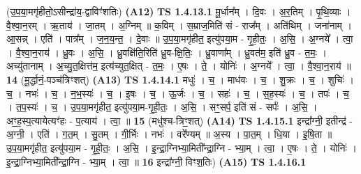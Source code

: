 \documentclass[17pt]{extarticle}
\begin{document}
                      (उ॒प॒या॒मगृ॑हीतो॒ऽसीन्द्रा॑य॒-द्वाविꣳ॑शतिः)  \textbf{(A12)} \newline \newline
                                \textbf{ TS 1.4.13.1} \newline
                  मू॒र्धान᳚म् । दि॒वः । अ॒र॒तिम् । पृ॒थि॒व्याः । वै॒श्वा॒न॒रम् । ऋ॒ताय॑ । जा॒तम् । अ॒ग्निम् ॥ क॒विम् । स॒म्राज॒मिति॑ सं - राज᳚म् । अति॑थिम् । जना॑नाम् । आ॒सन्न् । एति॑ । पात्र᳚म् । ज॒न॒य॒न्त॒ । दे॒वाः ॥ उ॒प॒या॒मगृ॑हीत॒ इत्यु॑पया॒म - गृ॒ही॒तः॒ । अ॒सि॒ । अ॒ग्नये᳚ । त्वा॒ । वै॒श्वा॒न॒राय॑ । ध्रु॒वः । अ॒सि॒ । ध्रु॒वक्षि॑ति॒रिति॑ ध्रु॒व-क्षि॒तिः॒ । ध्रु॒वाणा᳚म् । ध्रु॒वत॑म॒ इति॑ ध्रु॒व - त॒मः॒ । अच्यु॑तानाम् । अ॒च्यु॒त॒क्षित्त॑म॒ इत्य॑च्युत॒क्षित् - त॒मः॒ । ए॒षः । ते॒ । योनिः॑ । अ॒ग्नये᳚ । त्वा॒ । वै॒श्वा॒न॒राय॑ ॥ \textbf{  14} \newline
                  \newline
                      (मू॒र्द्धानं॒-पञ्च॑त्रिꣳशत्)  \textbf{(A13)} \newline \newline
                                \textbf{ TS 1.4.14.1} \newline
                  मधुः॑ । च॒ । माध॑वः । च॒ । शु॒क्रः । च॒ । शुचिः॑ । च॒ । नभः॑ । च॒ । न॒भ॒स्यः॑ । च॒ । इ॒षः । च॒ । ऊ॒र्जः । च॒ । सहः॑ । च॒ । स॒ह॒स्यः॑ । च॒ । तपः॑ । च॒ । त॒प॒स्यः॑ । च॒ । उ॒प॒या॒मगृ॑हीत॒ इत्यु॑पया॒म-गृ॒ही॒तः॒ । अ॒सि॒ । सꣳ॒॒सर्प॒ इति॑ सं - सर्पः॑ । अ॒सि॒ । अꣳ॒॒ह॒स्प॒त्यायेत्यꣳ॑हः - प॒त्याय॑ । त्वा॒ ॥ \textbf{  15 } \newline
                  \newline
                      (मधु॑श्च-त्रिꣳ॒॒शत्)  \textbf{(A14)} \newline \newline
                                \textbf{ TS 1.4.15.1} \newline
                  इन्द्रा᳚ग्नी॒ इतीन्द्र॑ - अ॒ग्नी॒ । एति॑ । ग॒त॒म् । सु॒तम् । गी॒र्भिः । नभः॑ । वरे᳚ण्यम् ॥ अ॒स्य । पा॒त॒म् । धि॒या । इ॒षि॒ता ॥ उ॒प॒या॒मगृ॑हीत॒ इत्यु॑पया॒म - गृ॒ही॒तः॒ । अ॒सि॒ । इ॒न्द्रा॒ग्निभ्या॒मिती᳚न्द्रा॒ग्नि - भ्या॒म् । त्वा॒ । ए॒षः । ते॒ । योनिः॑ । इ॒न्द्रा॒ग्निभ्या॒मिती᳚न्द्रा॒ग्नि - भ्या॒म् । त्वा॒ ॥ \textbf{  16} \newline
                  \newline
                       इन्द्रा᳚ग्नी॒ विꣳश॒तिः)  \textbf{(A15)} \newline \newline
                                \textbf{ TS 1.4.16.1} \newline
\end{document}
